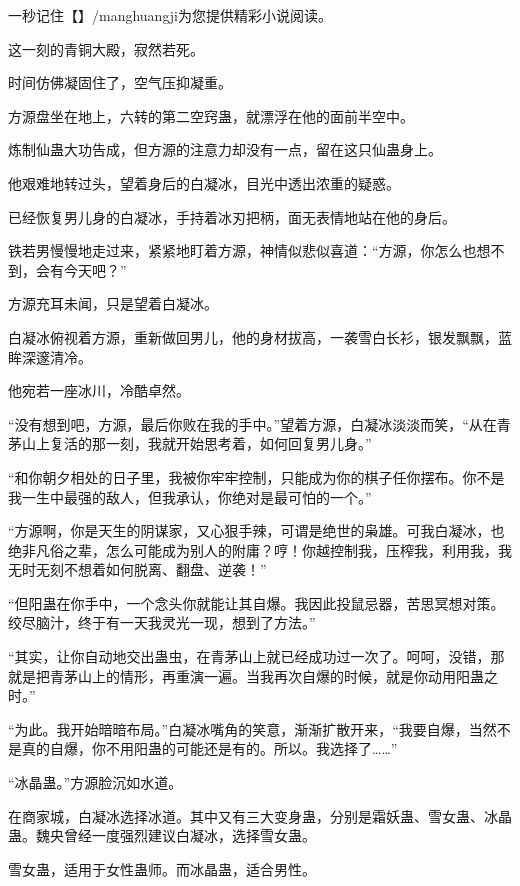 
\begin{this_body}

一秒记住【】/manghuangji为您提供精彩小说阅读。

这一刻的青铜大殿，寂然若死。

时间仿佛凝固住了，空气压抑凝重。

方源盘坐在地上，六转的第二空窍蛊，就漂浮在他的面前半空中。

炼制仙蛊大功告成，但方源的注意力却没有一点，留在这只仙蛊身上。

他艰难地转过头，望着身后的白凝冰，目光中透出浓重的疑惑。

已经恢复男儿身的白凝冰，手持着冰刃把柄，面无表情地站在他的身后。

铁若男慢慢地走过来，紧紧地盯着方源，神情似悲似喜道：“方源，你怎么也想不到，会有今天吧？”

方源充耳未闻，只是望着白凝冰。

白凝冰俯视着方源，重新做回男儿，他的身材拔高，一袭雪白长衫，银发飘飘，蓝眸深邃清冷。

他宛若一座冰川，冷酷卓然。

“没有想到吧，方源，最后你败在我的手中。”望着方源，白凝冰淡淡而笑，“从在青茅山上复活的那一刻，我就开始思考着，如何回复男儿身。”

“和你朝夕相处的日子里，我被你牢牢控制，只能成为你的棋子任你摆布。你不是我一生中最强的敌人，但我承认，你绝对是最可怕的一个。”

“方源啊，你是天生的阴谋家，又心狠手辣，可谓是绝世的枭雄。可我白凝冰，也绝非凡俗之辈，怎么可能成为别人的附庸？哼！你越控制我，压榨我，利用我，我无时无刻不想着如何脱离、翻盘、逆袭！”

“但阳蛊在你手中，一个念头你就能让其自爆。我因此投鼠忌器，苦思冥想对策。绞尽脑汁，终于有一天我灵光一现，想到了方法。”

“其实，让你自动地交出蛊虫，在青茅山上就已经成功过一次了。呵呵，没错，那就是把青茅山上的情形，再重演一遍。当我再次自爆的时候，就是你动用阳蛊之时。”

“为此。我开始暗暗布局。”白凝冰嘴角的笑意，渐渐扩散开来，“我要自爆，当然不是真的自爆，你不用阳蛊的可能还是有的。所以。我选择了……”

“冰晶蛊。”方源脸沉如水道。

在商家城，白凝冰选择冰道。其中又有三大变身蛊，分别是霜妖蛊、雪女蛊、冰晶蛊。魏央曾经一度强烈建议白凝冰，选择雪女蛊。

雪女蛊，适用于女性蛊师。而冰晶蛊，适合男性。


\end{this_body}
